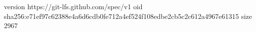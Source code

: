 version https://git-lfs.github.com/spec/v1
oid sha256:e71ef97c62388e4a6d6cdb0fe712a4ef524f108edbe2cb5c2c612a4967e61315
size 2967
